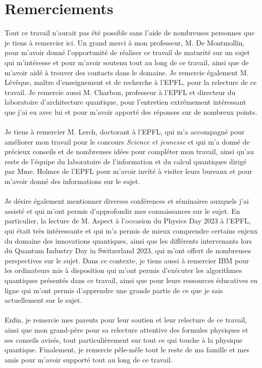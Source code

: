 \chapter*{Remerciements}

Tout ce travail n'aurait pas été possible sans l'aide de nombreuses personnes que je tiens à remercier ici.
Un grand merci à mon professeur, M. De Montmollin, pour m'avoir donné l'opportunité de réaliser ce travail
de maturité sur un sujet qui m'intéresse et pour m'avoir soutenu tout au long de ce travail, ainsi que de
m'avoir aidé à trouver des contacts dans le domaine.
Je remercie également M. Lévêque, maître d'enseignement et de recherche à l'EPFL, pour la relecture de ce travail.
Je remercie aussi M. Charbon, professeur à l'EPFL et directeur du laboratoire d'architecture quantique, pour l'entretien
extrêmement intéressant que j'ai eu avec lui et pour m'avoir apporté des réponses sur de nombreux points.\\ \\
Je tiens à remercier M. Lerch, doctorant à l'EPFL, qui m'a accompagné pour améliorer mon travail pour le
concours \textit{Science et jeunesse} et qui m'a donné de précieux conseils et de nombreuses idées pour
compléter mon travail, ainsi qu'au reste de l'équipe du laboratoire de l'information et du calcul quantiques dirigé par
Mme. Holmes de l'EPFL pour m'avoir invité à visiter leurs bureaux et pour m'avoir donné des informations sur le sujet.\\ \\
Je désire également mentionner diverses conférences et séminaires auxquels j'ai assisté et qui m'ont permis d'approfondir
mes connaissances sur le sujet.
En particulier, la lecture de M. Aspect à l'occasion du Physics Day 2023 à l'EPFL, qui était très intéressante et qui
m'a permis de mieux comprendre certains enjeux du domaine des innovations quantiques, ainsi que les différents
intervenants lors du Quantum Industry Day in Switzerland 2023, qui m'ont offert de nombreuses perspectives sur le sujet.
Dans ce contexte, je tiens aussi à remercier IBM pour les ordinateurs mis à disposition qui m'ont permis d'exécuter
les algorithmes quantiques présentés dans ce travail, ainsi que pour leurs ressources éducatives en ligne qui m'ont
permis d'apprendre une grande partie de ce que je sais actuellement sur le sujet.\\ \\
Enfin, je remercie mes parents pour leur soutien et leur relecture de ce travail, ainsi que mon grand-père pour
sa relecture attentive des formules physiques et ses conseils avisés, tout particulièrement sur tout ce qui touche
à la physique quantique.
Finalement, je remercie pêle-mêle tout le reste de ma famille et mes amis pour m'avoir supporté tout au long de ce
travail.